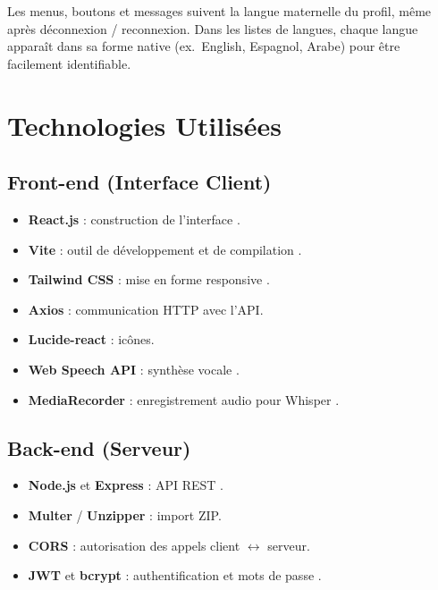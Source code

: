 \documentclass[12pt,twoside,letterpaper]{article}
\begin{document}
Les menus, boutons et messages suivent la langue maternelle du profil,
m\^eme apr\`es d\'econnexion / reconnexion.
Dans les listes de langues, chaque langue appara\^it dans sa forme native
(ex.\ English, Espagnol, Arabe) pour \^etre facilement identifiable.

\newpage

\section{Technologies Utilis\'ees}

\subsection{Front-end (Interface Client)}
\begin{itemize}[leftmargin=*]
  \item \textbf{React.js} : construction de l'interface \cite{react}.
  \item \textbf{Vite} : outil de d\'eveloppement et de compilation \cite{vite}.
  \item \textbf{Tailwind CSS} : mise en forme responsive \cite{tailwind}.
  \item \textbf{Axios} : communication HTTP avec l'API.
  \item \textbf{Lucide-react} : ic\^ones.
  \item \textbf{Web Speech API} : synth\`ese vocale \cite{webspeech}.
  \item \textbf{MediaRecorder} : enregistrement audio pour Whisper \cite{mediarecorder}.
\end{itemize}

\subsection{Back-end (Serveur)}
\begin{itemize}[leftmargin=*]
  \item \textbf{Node.js} et \textbf{Express} : API REST \cite{nodejs,express}.
  \item \textbf{Multer} / \textbf{Unzipper} : import ZIP.
  \item \textbf{CORS} : autorisation des appels client $\leftrightarrow$ serveur.
  \item \textbf{JWT} et \textbf{bcrypt} : authentification et mots de passe \cite{rfc7519}.
\end{itemize}
\end{document}
